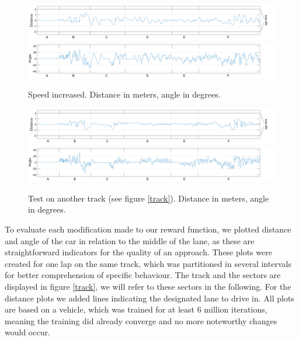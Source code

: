 \begin{figure}[!t]
\centering
\includegraphics[scale=0.265]{../plots/dist_eval_log_smooth_serpentine_10speed}
\vspace{0.5em}
\includegraphics[scale=0.265]{../plots/ang_eval_log_smooth_serpentine_10speed}
\vspace{-2.25em}
\caption{Speed increased. Distance in meters, angle in degrees.}
\label{straight06}
\vspace{1em}
\includegraphics[scale=0.265]{../plots/dist_eval_log_smooth_serpentine_06speed}
\vspace{0.5em}
\includegraphics[scale=0.265]{../plots/ang_eval_log_smooth_serpentine_06speed}
\vspace{-2.25em}\label{fig_first_case}
\caption{Test on another track (see figure \ref{track}). Distance in meters, angle in degrees.}
\label{smooth06}
\end{figure}

To evaluate each modification made to our reward function, we plotted distance and angle of the car in relation to the middle of the lane, as these are straightforward indicators for the quality of an approach. These plots were created for one lap on the same track, which was partitioned in several intervals for better comprehension of specific behaviour. The track and the sectors are displayed in figure \ref{track}, we will refer to these sectors in the following. For the distance plots we added lines indicating the designated lane to drive in. All plots are based on a vehicle, which was trained for at least 6 million iterations, meaning the training did already converge and no more noteworthy changes would occur. 

